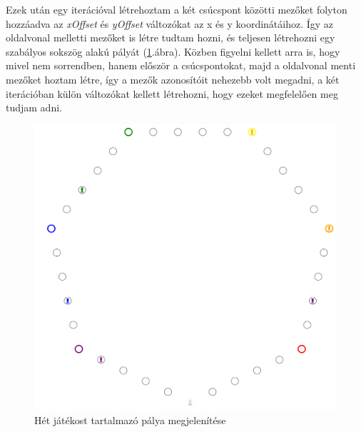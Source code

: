 \documentclass[a4paper,twoside]{article}
\begin{document}
Ezek után egy iterációval létrehoztam a két csúcspont közötti mezőket folyton hozzáadva az \textit{xOffset} és \textit{yOffset} változókat az x és y koordinátáihoz. Így az oldalvonal melletti mezőket is létre tudtam hozni, és teljesen létrehozni egy szabályos sokszög alakú pályát (\ref{hetesPalya}.ábra). Közben figyelni kellett arra is, hogy mivel nem sorrendben, hanem először a csúcspontokat, majd a oldalvonal menti mezőket hoztam létre, így a mezők azonosítóit nehezebb volt megadni, a két iterációban külön változókat kellett létrehozni, hogy ezeket megfelelően meg tudjam adni. 

\begin{figure}
	\caption{Hét játékost tartalmazó pálya megjelenítése}
	\label{hetesPalya}
	\centering
	\includegraphics[scale=0.5]{7espalya}
\end{figure}
\end{document}
